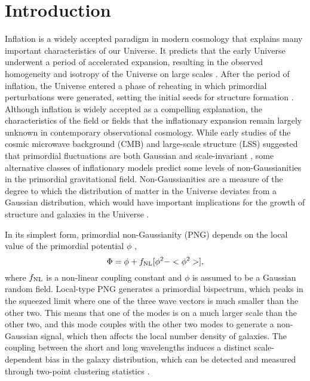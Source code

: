 \section{Introduction}
\label{sec:introduction}

Inflation is a widely accepted paradigm in modern cosmology that explains many important characteristics of our Universe. It predicts that the early Universe underwent a period of accelerated expansion, resulting in the observed homogeneity and isotropy of the Universe on large scales \citep[see, e.g.,][for a review]{weinberg2013observational}. After the period of inflation, the Universe entered a phase of reheating in which primordial perturbations were generated, setting the initial seeds for structure formation \citep{kofman1994reheating, bassett2006inflation, lyth2009primordial}. Although inflation is widely accepted as a compelling explanation, the characteristics of the field or fields that  the inflationary expansion remain largely unknown in contemporary observational cosmology. While early studies of the cosmic microwave background (CMB) and large-scale structure (LSS) suggested that primordial fluctuations are both Gaussian and scale-invariant \citep{PhysRevD.69.103501, guth2005inflationary}, some alternative classes of inflationary models predict some levels of non-Gaussianities in the primordial gravitational field. Non-Gaussianities are a measure of the degree to which the distribution of matter in the Universe deviates from a Gaussian distribution, which would have important implications for the growth of structure and galaxies in the Universe \citep[see, e.g.,][]{2010CQGra..27l4011D, Biagetti2019Galax...7...71B}.

In its simplest form, primordial non-Gaussianity (PNG) depends on the local value of the primordial potential $\phi$ \citep{komatsu2001acoustic},
\begin{equation}
 \Phi = \phi + f_{\rm NL} [\phi^{2} - <\phi^{2}>],
\end{equation}
where $f_{\rm NL}$ is a non-linear coupling constant and $\phi$ is assumed to be a Gaussian random field. Local-type PNG generates a primordial bispectrum, which peaks in the squeezed limit where one of the three wave vectors is much smaller than the other two. This means that one of the modes is on a much larger scale than the other two, and this mode couples with the other two modes to generate a non-Gaussian signal, which then affects the local number density of galaxies. The coupling between the short and long wavelengths induces a distinct scale-dependent bias in the galaxy distribution, which can be detected and measured through two-point clustering statistics \citep{dalal2008imprints}.


